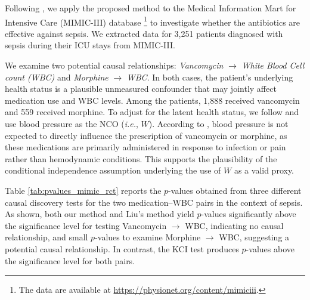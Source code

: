 \documentclass[
  12pt]{article}
\def\to{\rightarrow}
\begin{document}
Following \cite{liu2023causal}, we apply the proposed method to the Medical Information Mart for Intensive Care (MIMIC-III) database \citep{johnson2016mimic}\footnote{The data are available at \url{https://physionet.org/content/mimiciii}.} to investigate whether the antibiotics are effective against sepsis. We extracted data for 3,251 patients diagnosed with sepsis during their ICU stays from MIMIC-III.

We examine two potential causal relationships: \textit{Vancomycin} $\to$ \textit{White Blood Cell count (WBC)} and \textit{Morphine} $\to$ \textit{WBC}. In both cases, the patient’s underlying health status is a plausible unmeasured confounder that may jointly affect medication use and WBC levels. Among the patients, 1,888 received vancomycin and 559 received morphine. To adjust for the latent health status, we follow \cite{liu2023causal} and use blood pressure as the NCO (\emph{i.e.}, $W$). According to \cite{rybak2009therapeutic, dowell2022cdc}, blood pressure is not expected to directly influence the prescription of vancomycin or morphine, as these medications are primarily administered in response to infection or pain rather than hemodynamic conditions. This supports the plausibility of the conditional independence assumption underlying the use of $W$ as a valid proxy.

Table \ref{tab:pvalues_mimic_rct} reports the $p$-values obtained from three different causal discovery tests for the two medication–WBC pairs in the context of sepsis. As shown, both our method and Liu's method yield $p$-values significantly above the significance level for testing Vancomycin $\to$ WBC, indicating no causal relationship, and small $p$-values to examine Morphine $\to$ WBC, suggesting a potential causal relationship. In contrast, the KCI test produces $p$-values above the significance level for both pairs. 

\end{document}

